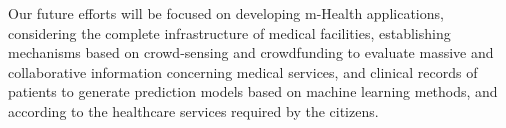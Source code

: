 \documentclass[sustainability,article,submit,pdftex,moreauthors]{Definitions/mdpi}
\begin{document}
Our future efforts will be focused on developing m-Health applications, considering the complete infrastructure of medical facilities, establishing mechanisms based on crowd-sensing and crowdfunding to evaluate massive and collaborative information concerning medical services, and clinical records of patients to generate prediction models based on machine learning methods, and according to the healthcare services required by the citizens.






\end{document}
